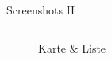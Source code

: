 \documentclass{beamer}
\begin{document}
	\begin{frame}{Screenshots II}
		\begin{columns}[onlytextwidth]
			
			\begin{column}{0.5\textwidth}
				\centering
				\begin{figure}
					\caption{Karte \& Liste}
				\end{figure}
			\end{column}
			

\end{columns}
\end{frame}
\end{document}
